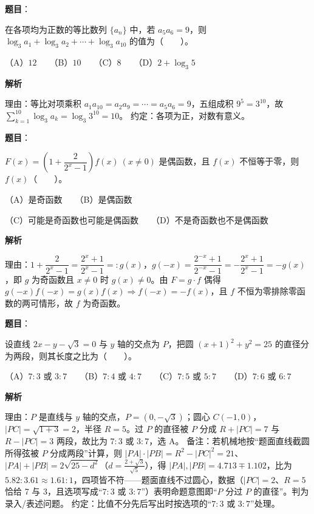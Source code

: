 \begin{answer}

\textbf{题目}：

在各项均为正数的等比数列 $\{a_n\}$ 中，若 $a_5a_6=9$，则 $\log_3 a_1+\log_3 a_2+\cdots+\log_3 a_{10}$ 的值为\mbox{（　　）}。

（A）$12$　　（B）$10$　　（C）$8$　　（D）$2+\log_3 5$

\textbf{解析}

理由：等比对项乘积 $a_1a_{10}=a_2a_9=\cdots=a_5a_6=9$，五组成积 $9^5=3^{10}$，故 $\sum\limits_{k=1}^{10}\log_3a_k=\log_3 3^{10}=10$。
约定：各项为正，对数有意义。


\end{answer}
\begin{answer}

\textbf{题目}：

$F(x)=\left(1+\dfrac{2}{2^x-1}\right)f(x)\ (x\ne0)$ 是偶函数，且 $f(x)$ 不恒等于零，则 $f(x)$\mbox{（　　）}。

（A）是奇函数　　（B）是偶函数

（C）可能是奇函数也可能是偶函数　　（D）不是奇函数也不是偶函数

\textbf{解析}

理由：$1+\dfrac{2}{2^x-1}=\dfrac{2^x+1}{2^x-1}=:g(x)$，$g(-x)=\dfrac{2^{-x}+1}{2^{-x}-1}=-\dfrac{2^x+1}{2^x-1}=-g(x)$，即 $g$ 为奇函数且 $x\ne0$ 时 $g(x)\ne0$。由 $F=g\cdot f$ 偶得 $g(-x)f(-x)=g(x)f(x)\Rightarrow f(-x)=-f(x)$，且 $f$ 不恒为零排除零函数的两可情形，故 $f$ 为奇函数。


\end{answer}
\begin{answer}

\textbf{题目}：

设直线 $2x-y-\sqrt3=0$ 与 $y$ 轴的交点为 $P$，把圆 $(x+1)^2+y^2=25$ 的直径分为两段，则其长度之比为\mbox{（　　）}。

（A）$7:3$ 或 $3:7$　　（B）$7:4$ 或 $4:7$　　（C）$7:5$ 或 $5:7$　　（D）$7:6$ 或 $6:7$

\textbf{解析}

理由：$P$ 是直线与 $y$ 轴的交点，$P=(0,-\sqrt3)$；圆心 $C(-1,0)$，$|PC|=\sqrt{1+3}=2$，半径 $R=5$。过 $P$ 的直径被 $P$ 分成 $R+|PC|=7$ 与 $R-|PC|=3$ 两段，故比为 $7:3$ 或 $3:7$，选 A。
备注：若机械地按“题面直线截圆所得弦被 $P$ 分成两段”计算，则 $|PA|\cdot|PB|=R^2-|PC|^2=21$、$|PA|+|PB|=2\sqrt{25-d^2}$（$d=\frac{2+\sqrt3}{\sqrt5}$），得 $|PA|,|PB|=4.713\mp1.102$，比为 $5.82:3.61\approx1.61:1$，四项皆不符——题面直线不过圆心，数据（$|PC|=2$、$R=5$ 恰给 7 与 3，且选项写成“$7:3$ 或 $3:7$”）表明命题意图即“$P$ 分过 $P$ 的直径”。判为录入/表述问题。
约定：比值不分先后写出时按选项的“$7:3$ 或 $3:7$”处理。


\end{answer}
